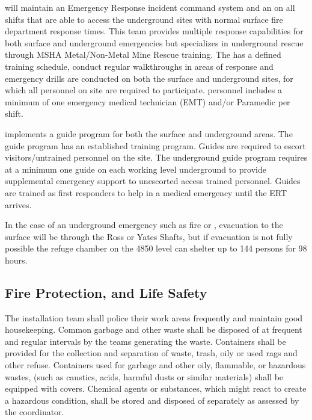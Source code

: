  will maintain an Emergency Response incident command
system and an  on all shifts that are able to access the
underground sites with normal surface fire department response
times. This team provides multiple response capabilities for both
surface and underground emergencies but specializes in underground
rescue through MSHA Metal/Non-Metal Mine Rescue training. The
 has a defined training schedule, conduct regular
walkthroughs in areas of response and emergency drills are conducted
on both the surface and underground sites, for which all personnel on
site are required to participate.  personnel includes a
minimum of one emergency medical technician (EMT) and/or Paramedic per
shift.

 implements a guide program for both the surface and
underground areas. The guide program has an established training
program. Guides are required to escort visitors/untrained personnel on
the  site. The underground guide program requires at a
minimum one guide on each working level underground to provide
supplemental emergency support to unescorted access trained
personnel. Guides are trained as first responders to help in a medical
emergency until the ERT arrives.

In the case of an underground emergency such as fire or ,
evacuation to the surface will be through the Ross or Yates Shafts,
but if evacuation is not fully possible the refuge chamber on the 4850
level can shelter up to 144 persons for 98 hours.

\subsection{Fire Protection,  and Life Safety}

The  installation team shall police their work areas
frequently and maintain good housekeeping. Common garbage and other
waste shall be disposed of at frequent and regular intervals by the
teams generating the waste. Containers shall be provided for the
collection and separation of waste, trash, oily or used rags and other
refuse.  Containers used for garbage and other oily, flammable, or
hazardous wastes, (such as caustics, acids, harmful dusts or similar
materials) shall be equipped with covers.  Chemical agents or
substances, which might react to create a hazardous condition, shall
be stored and disposed of separately as assessed by the
  coordinator.


